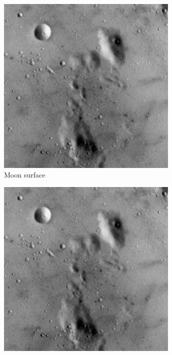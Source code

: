 \begin{figure}
\begin{subfigure}[b]{.23\textwidth}
  \centering
  \includegraphics[width=0.95\textwidth]{figures/test-images/original/moonsurface}
  \caption{Moon surface}
  \label{fig:test-images-moonsurface-original}
\end{subfigure}
\begin{subfigure}[b]{.23\textwidth}
  \centering
  \includegraphics[width=0.95\textwidth]{figures/test-images/truncate1/moonsurface}

\end{subfigure}
\end{figure}
